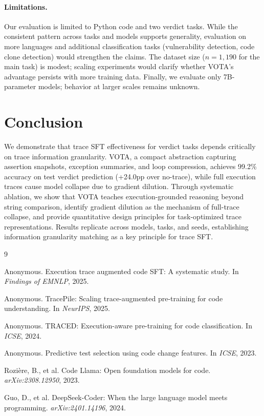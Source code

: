 \documentclass[11pt,a4paper]{article}
\begin{document}
\paragraph{Limitations.} Our evaluation is limited to Python code and two verdict tasks. While the consistent pattern across tasks and models supports generality, evaluation on more languages and additional classification tasks (vulnerability detection, code clone detection) would strengthen the claims. The dataset size ($n = 1{,}190$ for the main task) is modest; scaling experiments would clarify whether VOTA's advantage persists with more training data. Finally, we evaluate only 7B-parameter models; behavior at larger scales remains unknown.

\section{Conclusion}

We demonstrate that trace SFT effectiveness for verdict tasks depends critically on trace information granularity. VOTA, a compact abstraction capturing assertion snapshots, exception summaries, and loop compression, achieves 99.2\% accuracy on test verdict prediction (+24.0pp over no-trace), while full execution traces cause model collapse due to gradient dilution. Through systematic ablation, we show that VOTA teaches execution-grounded reasoning beyond string comparison, identify gradient dilution as the mechanism of full-trace collapse, and provide quantitative design principles for task-optimized trace representations. Results replicate across models, tasks, and seeds, establishing information granularity matching as a key principle for trace SFT.



\begin{thebibliography}{9}

Anonymous.
\newblock Execution trace augmented code SFT: A systematic study.
\newblock In \emph{Findings of EMNLP}, 2025.

Anonymous.
\newblock TracePile: Scaling trace-augmented pre-training for code understanding.
\newblock In \emph{NeurIPS}, 2025.

Anonymous.
\newblock TRACED: Execution-aware pre-training for code classification.
\newblock In \emph{ICSE}, 2024.

Anonymous.
\newblock Predictive test selection using code change features.
\newblock In \emph{ICSE}, 2023.

Rozi\`{e}re, B., et al.
\newblock Code Llama: Open foundation models for code.
\newblock \emph{arXiv:2308.12950}, 2023.

Guo, D., et al.
\newblock DeepSeek-Coder: When the large language model meets programming.
\newblock \emph{arXiv:2401.14196}, 2024.

\end{thebibliography}
\end{document}
